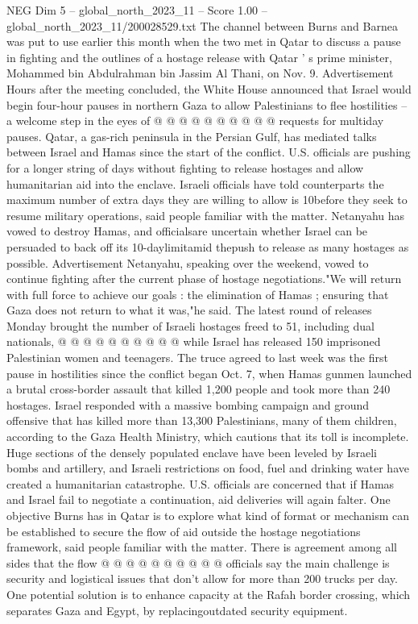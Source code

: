 \begin{textsample}{NEG Dim 5 – global\_north\_2023\_11 – Score 1.00 – global\_north\_2023\_11/200028529.txt}
The channel between Burns and Barnea was put to use earlier this month when the two met in Qatar to discuss a pause in fighting and the outlines of a hostage release with Qatar ' s prime minister, Mohammed bin Abdulrahman bin Jassim Al Thani, on Nov. 9.
Advertisement Hours after the meeting concluded, the White House announced that Israel would begin four-hour pauses in northern Gaza to allow Palestinians to flee hostilities -- a welcome step in the eyes of @ @ @ @ @ @ @ @ @ @ requests for multiday pauses.
Qatar, a gas-rich peninsula in the Persian Gulf, has mediated talks between Israel and Hamas since the start of the conflict.
U.S. officials are pushing for a longer string of days without fighting to release hostages and allow humanitarian aid into the enclave.
Israeli officials have told counterparts the maximum number of extra days they are willing to allow is 10before they seek to resume military operations, said people familiar with the matter.
Netanyahu has vowed to destroy Hamas, and officialsare uncertain whether Israel can be persuaded to back off its 10-daylimitamid thepush to release as many hostages as possible.
Advertisement Netanyahu, speaking over the weekend, vowed to continue fighting after the current phase of hostage negotiations."We will return with full force to achieve our goals : the elimination of Hamas ; ensuring that Gaza does not return to what it was,"he said.
The latest round of releases Monday brought the number of Israeli hostages freed to 51, including dual nationals, @ @ @ @ @ @ @ @ @ @ while Israel has released 150 imprisoned Palestinian women and teenagers.
The truce agreed to last week was the first pause in hostilities since the conflict began Oct. 7, when Hamas gunmen launched a brutal cross-border assault that killed 1,200 people and took more than 240 hostages.
Israel responded with a massive bombing campaign and ground offensive that has killed more than 13,300 Palestinians, many of them children, according to the Gaza Health Ministry, which cautions that its toll is incomplete.
Huge sections of the densely populated enclave have been leveled by Israeli bombs and artillery, and Israeli restrictions on food, fuel and drinking water have created a humanitarian catastrophe.
U.S. officials are concerned that if Hamas and Israel fail to negotiate a continuation, aid deliveries will again falter.
One objective Burns has in Qatar is to explore what kind of format or mechanism can be established to secure the flow of aid outside the hostage negotiations framework, said people familiar with the matter.
There is agreement among all sides that the flow @ @ @ @ @ @ @ @ @ @ officials say the main challenge is security and logistical issues that don't allow for more than 200 trucks per day.
One potential solution is to enhance capacity at the Rafah border crossing, which separates Gaza and Egypt, by replacingoutdated security equipment.

\end{textsample}
